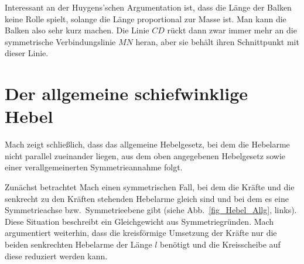 Interessant an der Huygens'schen Argumentation ist, dass die L\"ange der Balken keine Rolle
spielt, solange die L\"ange proportional zur Masse ist. Man kann die Balken also sehr kurz machen.
Die Linie $CD$ r\"uckt dann zwar immer mehr an die symmetrische Verbindungslinie $MN$ heran,
aber sie beh\"alt ihren Schnittpunkt mit dieser Linie. 

\section{Der allgemeine schiefwinklige Hebel}

Mach zeigt schlie\ss lich, dass das allgemeine Hebelgesetz, bei dem die Hebelarme nicht
parallel zueinander liegen, aus dem oben angegebenen Hebelgesetz sowie einer
verallgemeinerten Symmetrieannahme folgt. 

Zun\"achst betrachtet Mach einen symmetrischen Fall, bei dem die Kr\"afte und die senkrecht zu den
Kr\"aften stehenden Hebelarme gleich sind und bei dem es eine Symmetrieachse bzw.\ Symmetrieebene
gibt (siehe Abb.\ \ref{fig_Hebel_Allg}, links). Diese Situation beschreibt ein Gleichgewicht aus
Symmetriegr\"unden. 
Mach argumentiert weiterhin, dass die kreisf\"ormige Umsetzung der Kr\"afte nur die beiden
senkrechten Hebelarme der L\"ange $l$ ben\"otigt und die Kreisscheibe auf diese reduziert werden kann.


